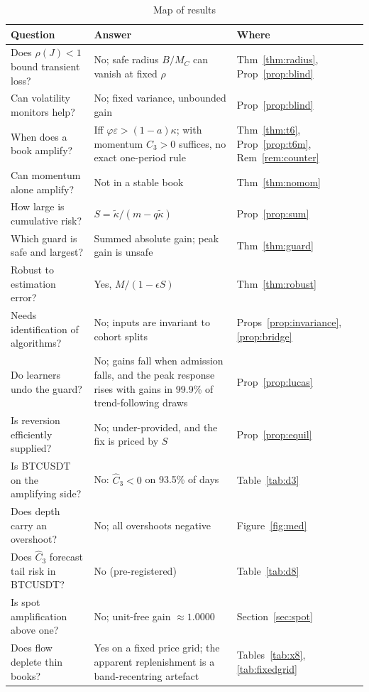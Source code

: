 \documentclass[12pt]{article}
\theoremstyle{definition}
\theoremstyle{remark}
\begin{document}
\begin{table}[t]\centering\small
\begin{threeparttable}
\caption{Map of results}\label{tab:map}
\begin{tabular}{p{}p{}p{}}
\toprule
Question & Answer & Where\\
\midrule
Does $\rho(J)<1$ bound transient loss? & No; safe radius $B/M_C$ can vanish at fixed $\rho$ & Thm~\ref{thm:radius}, Prop~\ref{prop:blind}\\
Can volatility monitors help? & No; fixed variance, unbounded gain & Prop~\ref{prop:blind}\\
When does a book amplify? & Iff $\varphi\varepsilon>(1-a)\kappa$; with momentum $C_3>0$ suffices, no exact one-period rule & Thm~\ref{thm:t6}, Prop~\ref{prop:t6m}, Rem~\ref{rem:counter}\\
Can momentum alone amplify? & Not in a stable book & Thm~\ref{thm:nomom}\\
How large is cumulative risk? & $S=\tilde\kappa/(m-q\tilde\kappa)$ & Prop~\ref{prop:sum}\\
Which guard is safe and largest? & Summed absolute gain; peak gain is unsafe & Thm~\ref{thm:guard}\\
Robust to estimation error? & Yes, $M/(1-\epsilon S)$ & Thm~\ref{thm:robust}\\
Needs identification of algorithms? & No; inputs are invariant to cohort splits & Props~\ref{prop:invariance}, \ref{prop:bridge}\\
Do learners undo the guard? & No; gains fall when admission falls, and the peak response rises with gains in 99.9\% of trend-following draws & Prop~\ref{prop:lucas}\\
Is reversion efficiently supplied? & No; under-provided, and the fix is priced by $S$ & Prop~\ref{prop:equil}\\
Is BTCUSDT on the amplifying side? & No: $\hat C_3<0$ on 93.5\% of days & Table~\ref{tab:d3}\\
Does depth carry an overshoot? & No; all overshoots negative & Figure~\ref{fig:med}\\
Does $\hat C_3$ forecast tail risk in BTCUSDT? & No (pre-registered) & Table~\ref{tab:d8}\\
Is spot amplification above one? & No; unit-free gain $\approx1.0000$ & Section~\ref{sec:spot}\\
Does flow deplete thin books? & Yes on a fixed price grid; the apparent replenishment is a band-recentring artefact & Tables~\ref{tab:x8}, \ref{tab:fixedgrid}\\

\end{tabular}
\end{threeparttable}
\end{table}
\end{document}
